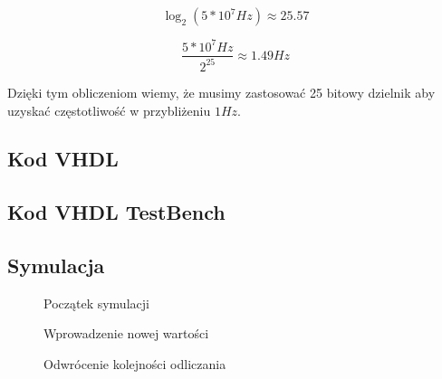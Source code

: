 \documentclass[a4paper,12pt]{extarticle}  %
\begin{document}
$$\log_2(5*10^7Hz)\approx25.57$$

$$\frac{5*10^7Hz}{2^{25}}\approx1.49Hz$$

Dzięki tym obliczeniom wiemy, że musimy zastosować 25 bitowy dzielnik aby uzyskać częstotliwość w przybliżeniu $1Hz$.
\subsection{Kod VHDL}

\subsection{Kod VHDL TestBench}


\subsection{Symulacja}
\begin{figure}[H]
   \centering
   \caption{Początek symulacji}
\end{figure}
\begin{figure}[H]
	\centering
	\caption{Wprowadzenie nowej wartości}
 \end{figure}
 \begin{figure}[H]
	\centering
	\caption{Odwrócenie kolejności odliczania}
 \end{figure}
\end{document}
